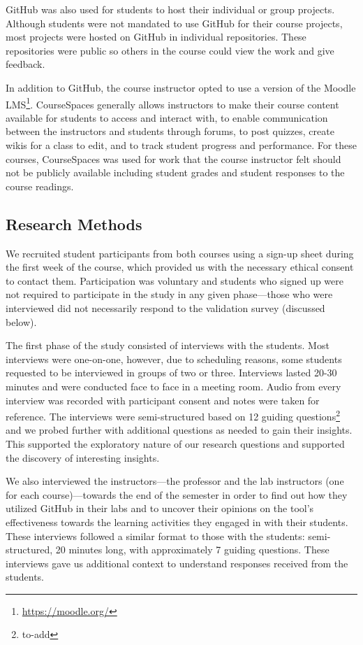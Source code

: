 GitHub was also used for students to host their individual or group projects. Although students were not mandated to use GitHub for their course projects, most projects were hosted on GitHub in individual repositories. These repositories were public so others in the course could view the work and give feedback.

In addition to GitHub, the course instructor opted to use a version of the Moodle LMS\footnote{\url{https://moodle.org/}}. CourseSpaces generally allows instructors to make their course content available for students to access and interact with, to enable communication between the instructors and students through forums, to post quizzes, create wikis for a class to edit, and to track student progress and performance. For these courses, CourseSpaces was used for work that the course instructor felt should not be publicly available including student grades and student responses to the course readings.

\subsection{Research Methods}
We recruited student participants from both courses using a sign-up sheet during the first week of the course, which provided us with the necessary ethical consent to contact them. Participation was voluntary and students who signed up were not required to participate in the study in any given phase---those who were interviewed did not necessarily respond to the validation survey (discussed below).

The first phase of the study consisted of interviews with the students. Most interviews were one-on-one, however, due to scheduling reasons, some students requested to be interviewed in groups of two or three. Interviews lasted 20-30 minutes and were conducted face to face in a meeting room. Audio from every interview was recorded with participant consent and notes were taken for reference. The interviews were semi-structured based on 12 guiding questions\footnote{to-add} and we probed further with additional questions as needed to gain their insights. This supported the exploratory nature of our research questions and supported the discovery of interesting insights.   

We also interviewed the instructors---the professor and the lab instructors (one for each course)---towards the end of the semester in order to find out how they utilized GitHub in their labs and to uncover their opinions on the tool's effectiveness towards the learning activities they engaged in with their students. These interviews followed a similar format to those with the students: semi-structured, 20 minutes long, with approximately 7 guiding questions.  These interviews gave us additional context to understand responses received from the students. 

